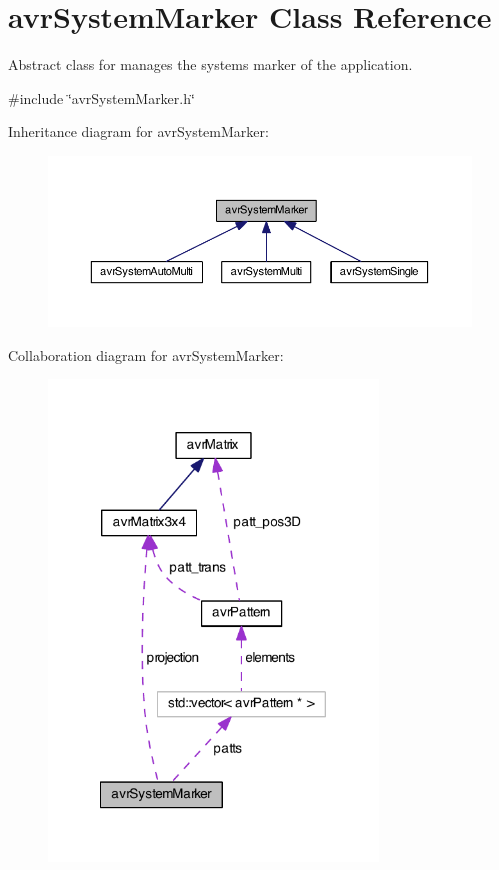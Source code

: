 \hypertarget{classavr_system_marker}{\section{avr\-System\-Marker Class Reference}
\label{classavr_system_marker}
}


Abstract class for manages the systems marker of the application.  




{\ttfamily \#include \char`\"{}avr\-System\-Marker.\-h\char`\"{}}



Inheritance diagram for avr\-System\-Marker\-:\nopagebreak
\begin{figure}[H]
\begin{center}
\leavevmode
\includegraphics[width=350pt]{classavr_system_marker__inherit__graph}
\end{center}
\end{figure}


Collaboration diagram for avr\-System\-Marker\-:\nopagebreak
\begin{figure}[H]
\begin{center}
\leavevmode
\includegraphics[width=248pt]{classavr_system_marker__coll__graph}
\end{center}
\end{figure}
